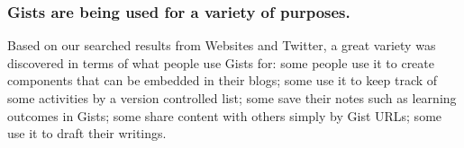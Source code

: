\subsubsection{Gists are being used for a variety of purposes.}
Based on our searched results from Websites and Twitter, a great variety was discovered in terms of what people use Gists for: some people use it to create components that can be embedded in their blogs; some use it to keep track of some activities by a version controlled list; some save their notes such as learning outcomes in Gists; some share content with others simply by Gist URLs; some use it to draft their writings.